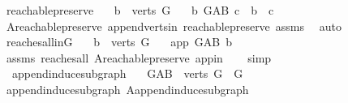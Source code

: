 \begin{isabellebody}
\ reachable{}{\isacharunderscore}{\kern0pt}preserve{}{\isacharcolon}{\kern0pt}\isanewline
\ \ \ {\isachardoublequoteopen}b\ {\isasymin}\ verts\ G{\isachardoublequoteclose}\isanewline
\ \ \ {\isachardoublequoteopen}{\isacharparenleft}{\kern0pt}b\ {\isasymrightarrow}\isactrlsup {\isacharplus}{\kern0pt}\isactrlbsub G{\isacharunderscore}{\kern0pt}AB\isactrlesub \ c{\isacharparenright}{\kern0pt}\ {\isasymlongleftrightarrow}\ b\ {\isasymrightarrow}\isactrlsup {\isacharplus}{\kern0pt}\ c{\isachardoublequoteclose}\isanewline
%
\isadelimproof
\ \ %
\endisadelimproof
%
\isatagproof
{}\isamarkupfalse%
\ A{}{\isachardot}{\kern0pt}reachable{}{\isacharunderscore}{\kern0pt}preserve\ append{\isacharunderscore}{\kern0pt}verts{\isacharunderscore}{\kern0pt}in\ reachable{}{\isacharunderscore}{\kern0pt}preserve\ assms\ \isamarkupfalse%
\ auto%
\endisatagproof
{\isafoldproof}%
%
\isadelimproof
\isanewline
%
\endisadelimproof
\isanewline
{}\isamarkupfalse%
\ reaches{\isacharunderscore}{\kern0pt}all{\isacharunderscore}{\kern0pt}in{\isacharunderscore}{\kern0pt}G{\isacharcolon}{\kern0pt}\isanewline
\ \ \ {\isachardoublequoteopen}b\ {\isasymin}\ verts\ G{\isachardoublequoteclose}\isanewline
\ \ \ {\isachardoublequoteopen}app\ {\isasymrightarrow}\isactrlsup {\isacharplus}{\kern0pt}\isactrlbsub G{\isacharunderscore}{\kern0pt}AB\isactrlesub \ b{\isachardoublequoteclose}\isanewline
%
\isadelimproof
\ \ %
\endisadelimproof
%
\isatagproof
{}\isamarkupfalse%
\ assms{\isacharparenleft}{\kern0pt}{}{\isacharparenright}{\kern0pt}\ reaches{\isacharunderscore}{\kern0pt}all\ A{}{\isachardot}{\kern0pt}reachable{}{\isacharunderscore}{\kern0pt}preserve\ app{\isacharunderscore}{\kern0pt}in\isanewline
\ \ \isamarkupfalse%
\ simp%
\endisatagproof
{\isafoldproof}%
%
\isadelimproof
\ \isanewline
%
\endisadelimproof
\isanewline
{}\isamarkupfalse%
\ \ append{\isacharunderscore}{\kern0pt}induce{\isacharunderscore}{\kern0pt}subgraph{}{\isacharcolon}{\kern0pt}\ \isanewline
\ \ {\isachardoublequoteopen}G{\isacharunderscore}{\kern0pt}AB\ {\isasymrestriction}\ {\isacharparenleft}{\kern0pt}verts\ G{\isacharparenright}{\kern0pt}\ {\isacharequal}{\kern0pt}\ G{\isachardoublequoteclose}\isanewline
%
\isadelimproof
\ \ %
\endisadelimproof
%
\isatagproof
{}\isamarkupfalse%
\ append{\isacharunderscore}{\kern0pt}induce{\isacharunderscore}{\kern0pt}subgraph\ A{}{\isachardot}{\kern0pt}append{\isacharunderscore}{\kern0pt}induce{\isacharunderscore}{\kern0pt}subgraph\isanewline

\end{isabellebody}
